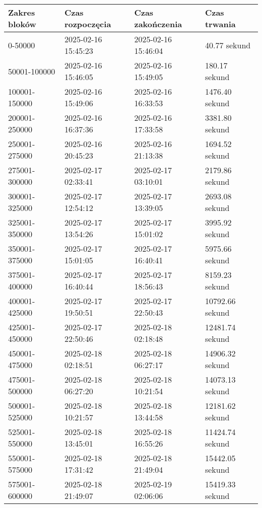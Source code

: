 \documentclass[12pt,a4paper]{report}
\theoremstyle{definition} %
\begin{document}
	\begin{table}[H]
	    \centering
	    \begin{tabular}{|l|l|l|l|}
	        \hline
	        Zakres bloków & Czas rozpoczęcia & Czas zakończenia & Czas trwania \\ \hline
	        0-50000 & 2025-02-16 15:45:23 & 2025-02-16 15:46:04 & 40.77 sekund \\ \hline
	        50001-100000 & 2025-02-16 15:46:05 & 2025-02-16 15:49:05 & 180.17 sekund \\ \hline
	        100001-150000 & 2025-02-16 15:49:06 & 2025-02-16 16:33:53 & 1476.40 sekund \\ \hline
	        200001-250000 & 2025-02-16 16:37:36 & 2025-02-16 17:33:58 & 3381.80 sekund \\ \hline
	        250001-275000 & 2025-02-16 20:45:23 & 2025-02-16 21:13:38 & 1694.52 sekund \\ \hline
	        275001-300000 & 2025-02-17 02:33:41 & 2025-02-17 03:10:01 & 2179.86 sekund \\ \hline
	        300001-325000 & 2025-02-17 12:54:12 & 2025-02-17 13:39:05 & 2693.08 sekund \\ \hline
	        325001-350000 & 2025-02-17 13:54:26 & 2025-02-17 15:01:02 & 3995.92 sekund \\ \hline
	        350001-375000 & 2025-02-17 15:01:05 & 2025-02-17 16:40:41 & 5975.66 sekund \\ \hline
	        375001-400000 & 2025-02-17 16:40:44 & 2025-02-17 18:56:43 & 8159.23 sekund \\ \hline
	        400001-425000 & 2025-02-17 19:50:51 & 2025-02-17 22:50:43 & 10792.66 sekund \\ \hline
	        425001-450000 & 2025-02-17 22:50:46 & 2025-02-18 02:18:48 & 12481.74 sekund \\ \hline
	        450001-475000 & 2025-02-18 02:18:51 & 2025-02-18 06:27:17 & 14906.32 sekund \\ \hline
	        475001-500000 & 2025-02-18 06:27:20 & 2025-02-18 10:21:54 & 14073.13 sekund \\ \hline
	        500001-525000 & 2025-02-18 10:21:57 & 2025-02-18 13:44:58 & 12181.62 sekund \\ \hline
	        525001-550000 & 2025-02-18 13:45:01 & 2025-02-18 16:55:26 & 11424.74 sekund \\ \hline
	        550001-575000 & 2025-02-18 17:31:42 & 2025-02-18 21:49:04 & 15442.05 sekund \\ \hline
	        575001-600000 & 2025-02-18 21:49:07 & 2025-02-19 02:06:06 & 15419.33 sekund \\ \hline

\end{tabular}
\end{table}
\end{document}
